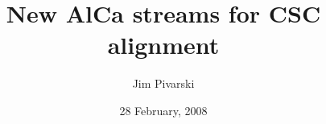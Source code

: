 \documentclass[compress]{beamer}
\title{New AlCa streams for CSC alignment}
\author{Jim Pivarski}
\institute{Texas A\&M University}
\date{28 February, 2008}
\begin{document}
\frame{\titlepage}


\end{document}
